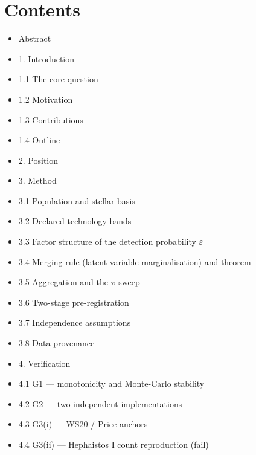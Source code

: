 \documentclass[11pt]{article}
\begin{document}
\section*{Contents}
\begin{itemize}\setlength{\itemsep}{0pt}
\item[] Abstract
\item[] 1. Introduction
\item[] \hspace{1.2em}1.1 The core question
\item[] \hspace{1.2em}1.2 Motivation
\item[] \hspace{1.2em}1.3 Contributions
\item[] \hspace{1.2em}1.4 Outline
\item[] 2. Position
\item[] 3. Method
\item[] \hspace{1.2em}3.1 Population and stellar basis
\item[] \hspace{1.2em}3.2 Declared technology bands
\item[] \hspace{1.2em}3.3 Factor structure of the detection probability \(\varepsilon\)
\item[] \hspace{1.2em}3.4 Merging rule (latent-variable marginalisation) and theorem
\item[] \hspace{1.2em}3.5 Aggregation and the \(\pi\) sweep
\item[] \hspace{1.2em}3.6 Two-stage pre-registration
\item[] \hspace{1.2em}3.7 Independence assumptions
\item[] \hspace{1.2em}3.8 Data provenance
\item[] 4. Verification
\item[] \hspace{1.2em}4.1 G1 --- monotonicity and Monte-Carlo stability
\item[] \hspace{1.2em}4.2 G2 --- two independent implementations
\item[] \hspace{1.2em}4.3 G3(i) --- WS20 / Price anchors
\item[] \hspace{1.2em}4.4 G3(ii) --- Hephaistos I count reproduction (fail)

\end{itemize}
\end{document}

